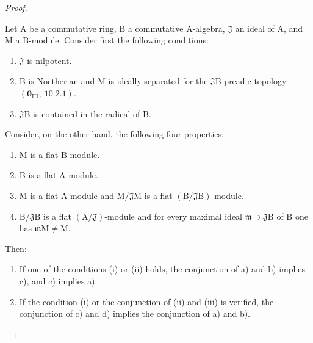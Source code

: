 \begin{proof}
\begin{lemma}[11.3.10.2]
\label{IV.11.3.10.2}
Let $\mathrm{A}$ be a commutative ring, $\mathrm{B}$ a commutative $\mathrm{A}$-algebra, $\mathfrak{J}$ an ideal of $\mathrm{A}$, and $\mathrm{M}$ a $\mathrm{B}$-module. Consider first the following conditions:
\begin{enumerate}[label=\emph{(\roman*)}]
  \item $\mathfrak{J}$ is nilpotent.
  \item $\mathrm{B}$ is Noetherian and $\mathrm{M}$ is ideally separated for the $\mathfrak{J}\mathrm{B}$-preadic topology $(\mathbf{0}_{\mathrm{III}},~10.2.1)$.
  \item $\mathfrak{J}\mathrm{B}$ is contained in the radical of $\mathrm{B}$.
\end{enumerate}
Consider, on the other hand, the following four properties:
\begin{enumerate}[label=\emph{\alph*)}]
  \item $\mathrm{M}$ is a flat $\mathrm{B}$-module.
  \item $\mathrm{B}$ is a flat $\mathrm{A}$-module.
  \item $\mathrm{M}$ is a flat $\mathrm{A}$-module and $\mathrm{M}/\mathfrak{J}\mathrm{M}$ is a flat $(\mathrm{B}/\mathfrak{J}\mathrm{B})$-module.
  \item $\mathrm{B}/\mathfrak{J}\mathrm{B}$ is a flat $(\mathrm{A}/\mathfrak{J})$-module and for every maximal ideal $\mathfrak{m}\supset\mathfrak{J}\mathrm{B}$ of $\mathrm{B}$ one has $\mathfrak{m}\mathrm{M}\neq\mathrm{M}$.
\end{enumerate}
Then:
\begin{enumerate}[label=\textup{\arabic{enumi}\textsuperscript{o}}]
  \item If one of the conditions \textup{(i)} or \textup{(ii)} holds, the conjunction of \textup{a)} and \textup{b)} implies \textup{c)}, and \textup{c)} implies \textup{a)}.
  \item {} If the condition \textup{(i)} or the conjunction of \textup{(ii)} and \textup{(iii)} is verified, the conjunction of \textup{c)} and \textup{d)} implies the conjunction of \textup{a)} and \textup{b)}.
\end{enumerate}
\end{lemma}


\end{proof}
